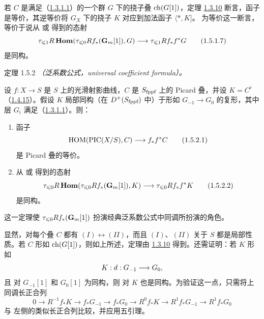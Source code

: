 若 $C$ 是满足（\hyperref[XVIII.par1.3.1.1]{1.3.1.1}）的一个群 $G$ 下的挠子叠 $\operatorname{ch}(G[1])$，定理 \hyperref[XVIII.thm1.3.10]{1.3.10} 断言，函子  是等价，\pageoriginale{}其逆等价将 $G_{X}$ 下的挠子 $K$ 对应到加法函子 $\langle \ast,K]$。 为等价这一断言，等价于说从  或  得到的态射
\begin{equation*}
\tau_{\leqslant 1}R\operatorname{\mathbf{Hom}}(\tau_{\leqslant
0}Rf_{\ast}(\mathbf{G}_{m}[1]),G)\longrightarrow \tau_{\leqslant 1}
Rf_{\ast}f^{\ast}G\tag{1.5.1.7}
\end{equation*}%
是同构。

\begin{enonce*}{定理 1.5.2}
\emph{（泛系数公式，universal coefficient formula）。}

设 $f:X\rightarrow S$ 是 $S$ 上的光滑射影曲线，$C$ 是 $S_{\text{\rm fppf}}$ 上的 Picard 叠，并设 $K=C^{\flat}$（\hyperref[XVIII.prop1.4.15]{1.4.15}）。假设 $K$ 局部同构（在 $D^{+}(S_{\text{\rm fppf}})$ 中）于形如 $G_{-1}\rightarrow G_{0}$ 的复形，其中层 $G_{i}$ 满足（\hyperref[XVIII.par1.3.1.1]{1.3.1.1}）。则：
\begin{enumerate}
\renewcommand{\theenumi}{\Roman{enumi}}
\renewcommand{\labelenumi}{(\theenumi)}
\item 函子 
\begin{equation*}
\operatorname{HOM}(\operatorname{PIC}(X/S),C)\longrightarrow f_{\ast}f^{\ast}C\tag{1.5.2.1}
\end{equation*}%
是 Picard 叠的等价。

\item 从  或  得到的态射
\begin{equation*}
\tau_{\leqslant 0}R\operatorname{\mathbf{Hom}}(\tau_{\leqslant 0}
Rf_{\ast}(\mathbf{G}_{m}[1]),K)\longrightarrow \tau_{\leqslant 0}
Rf_{\ast}f^{\ast}K\tag{1.5.2.2}
\end{equation*}%
是同构。
\end{enumerate}
\end{enonce*}

这一定理使 $\tau_{\leqslant 0}Rf_{\ast}(\mathbf{G}_{m}[1])$ 扮演经典泛系数公式中同调所扮演的角色。

显然，对每个叠 $C$ 都有 $(I)\leftrightarrow (II)$，而且 $(I)$、$(II)$ 关于 $S$ 都是局部性质。若 $C$ 形如 $\operatorname{ch}(G[1])$，则如上所述，定理由 \hyperref[XVIII.thm1.3.10]{1.3.10} 得到。还需证明：若 $K$ 形如
$$
K:d:G_{-1}\longrightarrow G_{0}{},
$$
且  对 $G_{-1}[1]$ 和 $G_{0}[1]$ 为同构，则  对 $K$ 也是同构。为验证这一点，只需将上同调长正合列
$$
0\longrightarrow R^{-1}f_{\ast}K\longrightarrow
f_{\ast}G_{-1}\longrightarrow f_{\ast}G_{0}\longrightarrow
R^{0}f_{\ast}K\longrightarrow R^{1} f_{\ast}G_{-1}\longrightarrow
R^{1}f_{\ast}G_{0}
$$
与\pageoriginale {} 左侧的类似长正合列比较，并应用五引理。

